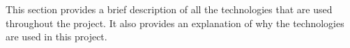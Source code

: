 This section provides a brief description of all the technologies that are used throughout the project. It also provides an explanation of why the technologies are used in this project.